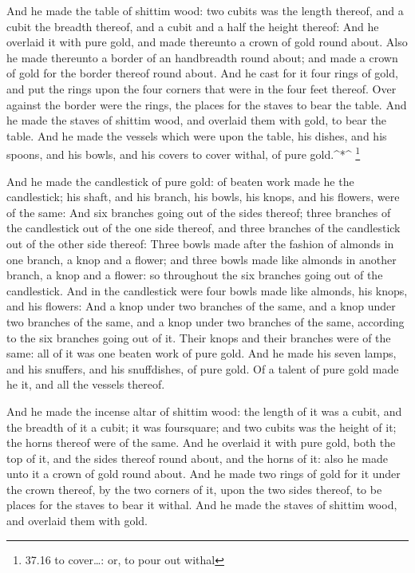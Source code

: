  And he made the table of shittim wood: two cubits was the
length thereof, and a cubit the breadth thereof, and a cubit and a half
the height thereof:  And he overlaid it with pure gold, and
made thereunto a crown of gold round about.  Also he made
thereunto a border of an handbreadth round about; and made a crown of
gold for the border thereof round about.  And he cast for
it four rings of gold, and put the rings upon the four corners that were
in the four feet thereof.  Over against the border were the
rings, the places for the staves to bear the table.  And he
made the staves of shittim wood, and overlaid them with gold, to bear
the table.  And he made the vessels which were upon the
table, his dishes, and his spoons, and his bowls, and his covers to
cover withal, of pure gold.\^{}*\^{} \footnote{37.16 to cover\ldots: or,
  to pour out withal}

 And he made the candlestick of pure gold: of beaten work
made he the candlestick; his shaft, and his branch, his bowls, his
knops, and his flowers, were of the same:  And six branches
going out of the sides thereof; three branches of the candlestick out of
the one side thereof, and three branches of the candlestick out of the
other side thereof:  Three bowls made after the fashion of
almonds in one branch, a knop and a flower; and three bowls made like
almonds in another branch, a knop and a flower: so throughout the six
branches going out of the candlestick.  And in the
candlestick were four bowls made like almonds, his knops, and his
flowers:  And a knop under two branches of the same, and a
knop under two branches of the same, and a knop under two branches of
the same, according to the six branches going out of it. 
Their knops and their branches were of the same: all of it was one
beaten work of pure gold.  And he made his seven lamps, and
his snuffers, and his snuffdishes, of pure gold.  Of a
talent of pure gold made he it, and all the vessels thereof.

 And he made the incense altar of shittim wood: the length
of it was a cubit, and the breadth of it a cubit; it was foursquare; and
two cubits was the height of it; the horns thereof were of the same.
 And he overlaid it with pure gold, both the top of it, and
the sides thereof round about, and the horns of it: also he made unto it
a crown of gold round about.  And he made two rings of gold
for it under the crown thereof, by the two corners of it, upon the two
sides thereof, to be places for the staves to bear it withal.
 And he made the staves of shittim wood, and overlaid them
with gold.

